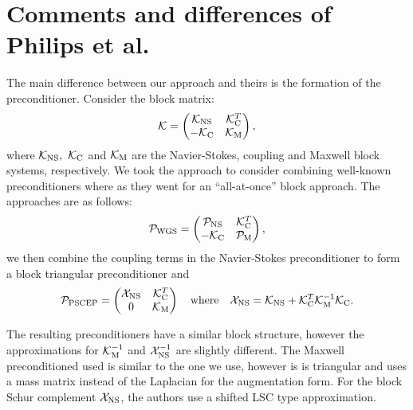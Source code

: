 \documentclass[11pt]{article}
\numberwithin{equation}{section}    %
\begin{document}
\pagestyle{fancyplain}
\fancyhead{}
\fancyfoot{} %
\fancyfoot[LE,RO]{\thepage \hspace{-5mm}}
\fancyfoot[CO,RE]{}



\section*{Comments and differences of Philips et al.}

The main difference between our approach and theirs is the formation of the preconditioner. Consider the block matrix:
\begin{equation} \nonumber
  \mathcal{K} = \begin{pmatrix}
    \mathcal{K}_{\rm NS} & \mathcal{K}^T_{\rm C} \\
    -\mathcal{K}_{\rm C} & \mathcal{K}_{\rm M} \\
  \end{pmatrix},
\end{equation}
where $\mathcal{K}_{\rm NS}, \ \mathcal{K}_{\rm C}$ and $\mathcal{K}_{\rm M}$ are the Navier-Stokes, coupling and Maxwell block systems, respectively. We took the approach to consider combining well-known preconditioners where as they went for an ``all-at-once'' block approach. The approaches are as follows:
\begin{equation} \nonumber
  \mathcal{P}_{\rm WGS} = \begin{pmatrix}
    \mathcal{P}_{\rm NS} & \mathcal{K}^T_{\rm C} \\
    -\mathcal{K}_{\rm C} & \mathcal{P}_{\rm M} \\
  \end{pmatrix},
\end{equation}
we then combine the coupling terms in the Navier-Stokes preconditioner to form a block triangular preconditioner and
\begin{equation} \nonumber
  \mathcal{P}_{\rm PSCEP} = \begin{pmatrix}
    \mathcal{X}_{\rm NS} & \mathcal{K}^T_{\rm C} \\
    0 & \mathcal{K}_{\rm M} \\
  \end{pmatrix} \quad \mbox{where} \quad
  \mathcal{X}_{\rm NS} = \mathcal{K}_{\rm NS} +  \mathcal{K}^T_{\rm C} \mathcal{K}^{-1}_{\rm M}  \mathcal{K}_{\rm C}.
  \end{equation}

The resulting preconditioners have a similar block structure, however the approximations for $\mathcal{K}^{-1}_{\rm M}$ and $\mathcal{X}^{-1}_{\rm NS}$ are slightly different. The Maxwell preconditioned used is similar to the one we use, however is is triangular and uses a mass matrix instead of the Laplacian for the augmentation form. For the block Schur complement $\mathcal{X}_{\rm NS}$, the authors use a shifted LSC type approximation.
\end{document}
